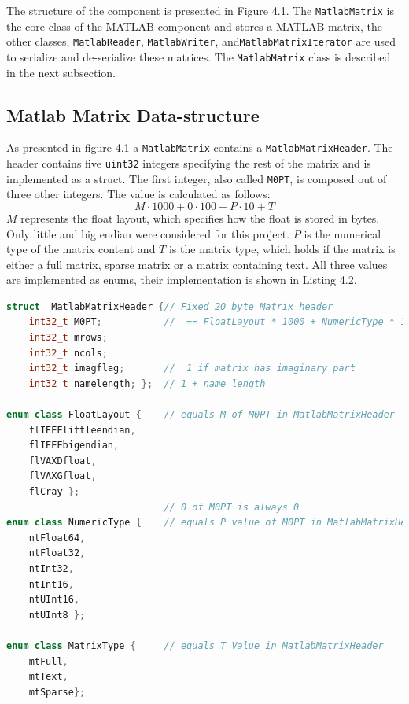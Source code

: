 The structure of the component is presented in Figure 4.1. The \texttt{MatlabMatrix} is the core class of the MATLAB component and stores a MATLAB matrix, the other classes, \texttt{MatlabReader}, \texttt{MatlabWriter}, and\texttt{MatlabMatrixIterator} are used to serialize and de-serialize these matrices. The \texttt{MatlabMatrix} class is described in the next subsection.
\subsection{Matlab Matrix Data-structure}
As presented in figure 4.1 a \texttt{MatlabMatrix} contains a \texttt{MatlabMatrixHeader}. The header contains five \texttt{uint32} integers specifying the rest of the matrix and is implemented as a struct. The first integer, also called \texttt{M0PT}, is composed out of three other integers. The value is calculated as follows:
$$M\cdot1000 + 0 \cdot 100 + P\cdot 10 + T$$
$M$ represents the float layout, which specifies how the float is stored in bytes. Only little and big endian were considered for this project. $P$ is the numerical type of the matrix content and $T$ is the matrix type, which holds if the matrix is either a full matrix, sparse matrix or a matrix containing text. All three values are implemented as enums, their implementation is shown in Listing 4.2.

\begin{lstlisting}[language=C++, caption=A code snippet showing the used enums and structs in the MATLAB header.]
struct  MatlabMatrixHeader {// Fixed 20 byte Matrix header
    int32_t M0PT;  			//  == FloatLayout * 1000 + NumericType * 10 + MatrixType
    int32_t mrows;
    int32_t ncols;
    int32_t imagflag;   	//  1 if matrix has imaginary part
    int32_t namelength; }; 	// 1 + name length

enum class FloatLayout {  	// equals M of M0PT in MatlabMatrixHeader
    flIEEElittleendian,
    flIEEEbigendian,
    flVAXDfloat,
    flVAXGfloat,
    flCray };
							// 0 of M0PT is always 0
enum class NumericType { 	// equals P value of M0PT in MatlabMatrixHeader
    ntFloat64,
    ntFloat32,
    ntInt32,
    ntInt16,
    ntUInt16,
    ntUInt8 };

enum class MatrixType {  	// equals T Value in MatlabMatrixHeader
    mtFull,
    mtText,
    mtSparse};
\end{lstlisting}

